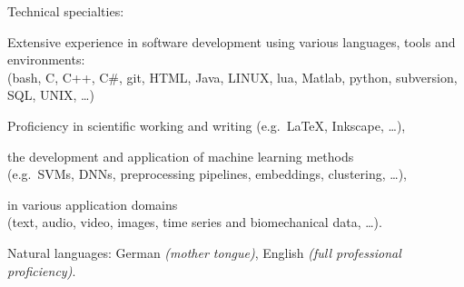 \documentclass[10pt,a4paper]{article} %
\begin{document}
\spacedhrule{0.5em}{-0.4em} %



\inlineheadsection %
{Technical specialties:}
{Extensive experience in software development
using various languages, tools and environments:\\
(bash, C, C++, C\#, git, HTML, Java, LINUX, lua, Matlab, python, subversion, SQL, UNIX, \dots )


Proficiency in scientific working and writing (e.g.\ \LaTeX, Inkscape, \dots),

the development and application of machine learning methods\\
(e.g.\ SVMs, DNNs, preprocessing pipelines, embeddings, clustering, \dots),

in various application domains\\
(text, audio, video, images, time series and biomechanical data, \dots).
}


\vspace{.65em}
\inlineheadsection %
{Natural languages:}
{German \textit{(mother tongue)}, English \textit{(full professional proficiency)}.}


\spacedhrule{1.6em}{-0.4em} %



\end{document}
